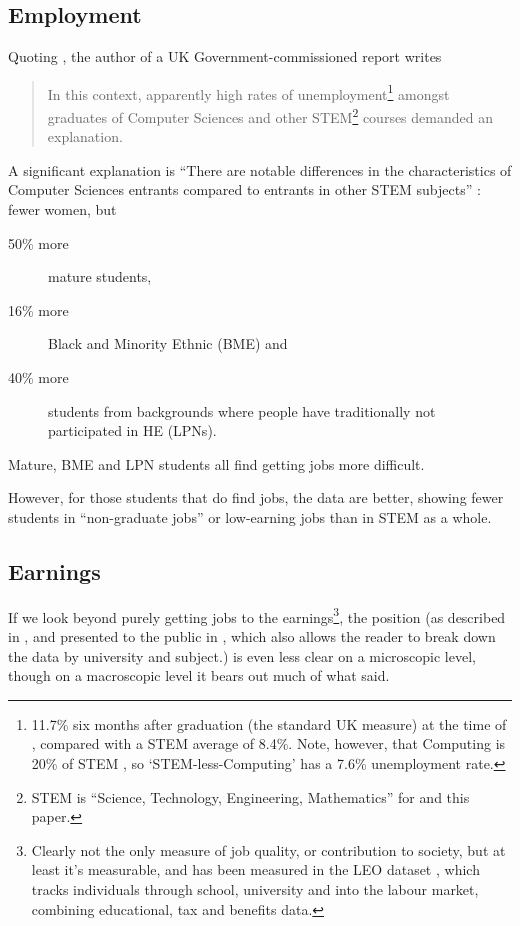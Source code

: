\documentclass[sigconf]{acmart}
\begin{document}
\subsection{Employment}
Quoting \cite{UKCES2015b}, the author of a UK Government-commissioned report \cite{Shadbolt2016a} writes
\begin{quote}
In this context, apparently high rates of unemployment\footnote{11.7\% six months after graduation (the standard UK measure) at the time of \cite{Shadbolt2016a}, compared with a STEM average of 8.4\%. Note, however, that Computing is 20\% of STEM \cite[Table 1]{Wakeham2016a}, so `STEM-less-Computing' has a 7.6\% unemployment rate.} amongst graduates of Computer Sciences and other STEM\footnote{STEM is ``Science, Technology, Engineering, Mathematics'' for \cite{Shadbolt2016a} and this paper.} courses demanded an explanation. 
\end{quote}
A significant explanation is ``There are notable differences in the characteristics of Computer Sciences entrants compared to entrants in other STEM subjects'' \cite[\P2.6]{Shadbolt2016a}: fewer women, but
\begin{description}
\item[50\% more] mature students,
\item[16\% more]Black and Minority Ethnic (BME) and 
\item[40\% more]students from backgrounds where people have traditionally not participated in HE (LPNs).
\end{description}
Mature, BME and LPN students all find getting jobs more difficult.
\par
However, for those students that do find jobs, the data are better,
showing \cite[Figure 6]{Shadbolt2016a} fewer students in
``non-graduate jobs'' or low-earning jobs than in STEM as a whole.

\subsection{Earnings}
If we look beyond purely getting jobs to the earnings\footnote{Clearly not the only measure of job quality, or contribution to society, but at least it's measurable, and has been measured in the LEO dataset \cite{DfE2017a}, which tracks individuals through school, university and into the labour market, combining educational, tax and benefits data.}, the position (as described in \cite{DfE2018d}, and presented to the public in \cite{BBC2018f}, which also allows the reader to break down the data by university and subject.) is even less clear on a microscopic level, though on a macroscopic level it bears out much of what \cite{Shadbolt2016a} said.
\end{document}
